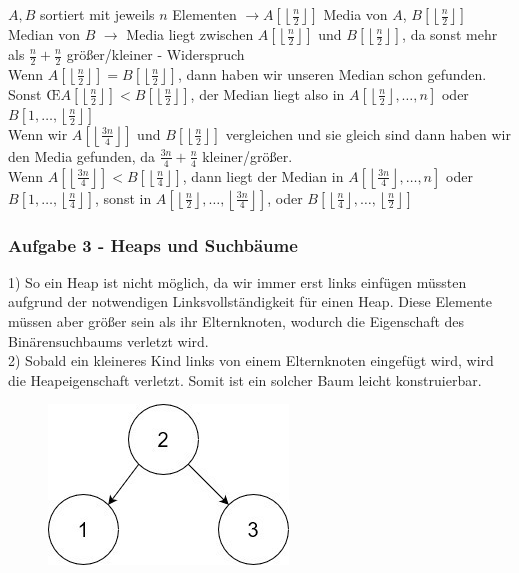 \documentclass[11pt]{scrartcl}
\newcommand{\task}[1]{\subsubsection*{#1}}
\newcommand{\subtask}[1]{\marginnote{#1)}}
\begin{document}
$ A,B $ sortiert mit jeweils $ n $ Elementen $\rightarrow A\left[ \left\lfloor \frac{ n }{ 2 }  \right\rfloor \right] $ Media von $ A $, $ B\left[\left\lfloor \frac{n}{2} \right\rfloor\right] $ Median von $ B $ $\rightarrow$ Media liegt zwischen $ A \left[ \left\lfloor \frac{ n }{ 2 }  \right\rfloor \right] $ und $ B\left[ \left\lfloor \frac{ n }{ 2 }  \right\rfloor\right] $, da sonst mehr als $\frac{n}{2} + \frac{n}{2}$ größer/kleiner - Widerspruch \\
Wenn $ A \left[ \left\lfloor \frac{ n }{ 2 }  \right\rfloor  \right] = B \left[ \left\lfloor \frac{ n }{ 2 }  \right\rfloor  \right] $, dann haben wir unseren Median schon gefunden.
Sonst \OE $A\left[\left\lfloor\frac{n}{2}\right\rfloor\right] < B\left[\left\lfloor\frac{n}{2}\right\rfloor\right] $, der Median liegt also in $ A\left[\left\lfloor\frac{n}{2}\right\rfloor, \dotsc, n \right] $ oder $ B \left[1, \dotsc, \left\lfloor \frac{ n }{ 2 }  \right\rfloor  \right] $ \\
Wenn wir $ A \left[ \left\lfloor \frac{3n}{ 4 }  \right\rfloor  \right] $ und $ B \left[ \left\lfloor \frac{ n }{ 2 }  \right\rfloor  \right] $ vergleichen und sie gleich sind dann haben wir den Media gefunden, da $\frac{3n}{4} + \frac{n}{4}$ kleiner/größer. \\
Wenn $ A \left[ \left\lfloor \frac{3n}{ 4 }  \right\rfloor  \right] < B \left[ \left\lfloor \frac{ n }{ 4 }  \right\rfloor  \right] $, dann liegt der Median in $ A \left[ \left\lfloor \frac{ 3n }{ 4 }  \right\rfloor, \dotsc, n \right] $ oder $ B \left[ 1, \dotsc, \left\lfloor \frac{ n }{ 4 }  \right\rfloor \right] $,
sonst in $ A \left[ \left\lfloor \frac{ n }{ 2 }  \right\rfloor, \dotsc, \left\lfloor \frac{3n}{ 4 }  \right\rfloor  \right] $,
oder $ B \left[ \left\lfloor \frac{ n }{ 4 }  \right\rfloor, \dotsc, \left\lfloor \frac{ n }{ 2 }  \right\rfloor  \right] $

\task{Aufgabe 3 - Heaps und Suchbäume}

    \subtask{a}
    1) So ein Heap ist nicht möglich, da wir immer erst links einfügen müssten aufgrund der notwendigen Linksvollständigkeit für einen Heap. Diese Elemente müssen aber größer sein als ihr Elternknoten, wodurch die Eigenschaft des Binärensuchbaums verletzt wird. \\

    2) Sobald ein kleineres Kind links von einem Elternknoten eingefügt wird, wird die Heapeigenschaft verletzt. Somit ist ein solcher Baum leicht konstruierbar.
    \begin{figure}[h]
    \includegraphics[scale = 0.5]{BaumOhneHeap.jpg}
    \centering
    \end{figure}
\end{document}
